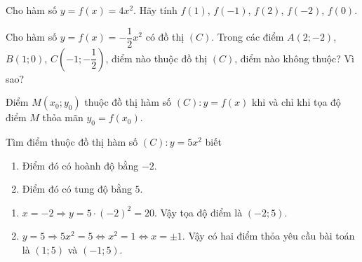 \begin{vd}
	Cho hàm số $ y = f(x) = 4x^2 $. Hãy tính $ f(1) $, $ f(-1) $, $ f(2) $, $ f(-2) $, $ f(0) $.
\end{vd}

\begin{vd}
	Cho hàm số $ y = f(x) = -\dfrac{1}{2}x^2 $ có đồ thị $ (C) $. Trong các điểm $ A(2;-2) $, $ B(1;0) $, $ C(-1;-\dfrac{1}{2}) $, điểm nào thuộc đồ thị $ (C) $, điểm nào không thuộc? Vì sao?
\end{vd}

\begin{note}
	Điểm $ M(x_0;y_0) $ thuộc đồ thị hàm số $ (C) \colon y = f(x) $ khi và chỉ khi tọa độ điểm $ M $ thỏa mãn $ y_0 = f(x_0) $.
\end{note}

\begin{vd}
	Tìm điểm thuộc đồ thị hàm số $ (C) \colon y = 5x^2 $ biết
	\begin{enumerate}
		\item Điểm đó có hoành độ bằng $ -2 $.
		\item Điểm đó có tung độ bằng $ 5 $.
	\end{enumerate}
	\loigiai
	{
		\begin{enumerate}
			\item $ x = -2 \Rightarrow y = 5 \cdot (-2)^2 = 20 $. Vậy tọa độ điểm là $ (-2;5) $.
			\item $ y = 5 \Rightarrow 5x^2 = 5 \Leftrightarrow x^2 = 1 \Leftrightarrow x = \pm 1 $. Vậy có hai điểm thỏa yêu cầu bài toán là $ (1;5) $ và $ (-1;5) $.
		\end{enumerate}
	}
\end{vd}

